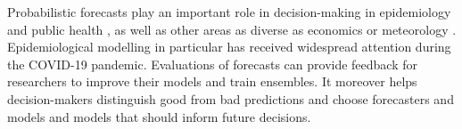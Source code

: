 \documentclass{article}
\begin{document}
Probabilistic forecasts \citep{heldProbabilisticForecastingInfectious2017} play an important role in decision-making in epidemiology and public health \citep{reichCollaborativeMultiyearMultimodel2019, funkShorttermForecastsInform2020, cramerEvaluationIndividualEnsemble2021, bracherShorttermForecastingCOVID192021, europeancovid-19forecasthubEuropeanCovid19Forecast2021, sherrattPredictivePerformanceMultimodel2022}, as well as other areas as diverse as economics \citep{timmermannForecastingMethodsFinance2018, elliottForecastingEconomicsFinance2016} or meteorology \citep{gneitingWeatherForecastingEnsemble2005, kukkonenReviewOperationalRegionalscale2012}. Epidemiological modelling in particular has received widespread attention during the COVID-19 pandemic. Evaluations of forecasts can provide feedback for researchers to improve their models and train ensembles. It moreover helps decision-makers distinguish good from bad predictions and choose forecasters and models and models that should inform future decisions.
\end{document}
